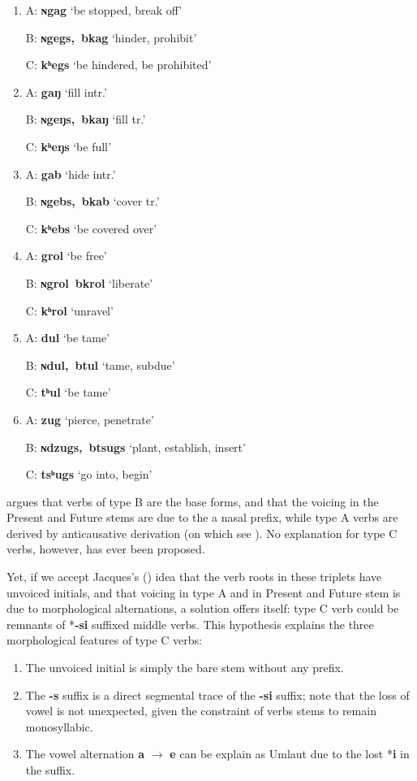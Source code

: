\documentclass[oneside,a4paper,11pt]{article}
\newcommand{\ipa}[1]{{\phon\textbf{\mbox{#1}}}}
\newcommand{\tib}[2]{\ipa{#1} `#2'}
\begin{document}
\begin{enumerate}
\item 
A: \tib{ɴgag}{be stopped, break off}

B: \tib{ɴgegs, bkag}{hinder, prohibit}

C: \tib{kʰegs}{be hindered, be prohibited}

\item 
A: \tib{gaŋ}{fill intr.}

B: \tib{ɴgeŋs, bkaŋ}{fill tr.}

C: \tib{kʰeŋs}{be full}

\item 
A: \tib{gab}{hide intr.}

B: \tib{ɴgebs, bkab}{cover tr.}

C: \tib{kʰebs}{be covered over}

\item 
A: \tib{grol}{be free}

B: \tib{ɴgrol  bkrol}{liberate}

C: \tib{kʰrol}{unravel}

\item 
A: \tib{dul}{be tame}

B: \tib{ɴdul, btul}{tame, subdue}

C: \tib{tʰul}{be tame}

\item 
A: \tib{zug}{pierce, penetrate}

B: \tib{ɴdzugs, btsugs}{plant, establish, insert}

C: \tib{tsʰugs}{go into, begin}
\end{enumerate}

\citet{jacques12internal} argues that verbs of type B are the base forms, and that the voicing in the Present and Future stems are due to the a nasal prefix, while type A verbs are derived by anticausative derivation (on which see \citealt{jacques15spontaneous, jacques15causative}). No explanation for type C verbs, however, has ever been proposed.  

Yet, if we accept Jacques's (\citeyear{jacques12internal}) idea that the verb roots in these triplets have unvoiced initials, and that voicing in type A and in Present and Future stem is due to morphological alternations, a solution offers itself: type C verb could be remnants of *\ipa{-si} suffixed middle verbs. This hypothesis explains the three morphological features of type C verbs:

\begin{enumerate}
\item The unvoiced initial is simply the bare stem without any prefix.
\item The \ipa{-s} suffix is a direct segmental trace of the \ipa{-si} suffix; note that the loss of vowel is not unexpected, given the constraint of verbs stems to remain monosyllabic.
\item The vowel alternation \ipa{a} $\rightarrow$ \ipa{e} can be explain as Umlaut due to the lost *\ipa{i} in the suffix. 
\end{enumerate}
\end{document}
